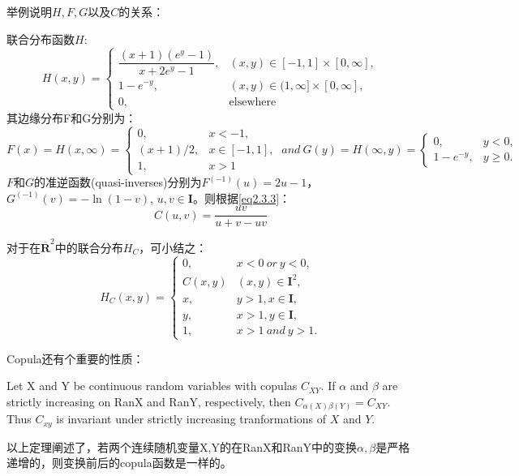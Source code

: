 举例说明$H,F,G$以及$C$的关系：
\begin{example}
    联合分布函数$H$:
    \begin{equation*}
        H(x,y) = 
            \begin{cases}
                \dfrac{(x+1)(e^y-1)}{x+2e^y-1}, & (x,y) \in [-1,1]\times [0,\infty], \\
            1-e^{-y},   & (x,y) \in (1,\infty] \times [0,\infty], \\
            0, & \mbox{elsewhere}
            \end{cases}
    \end{equation*}
    其边缘分布F和G分别为：
    \begin{equation*}
        F(x) = H(x,\infty)=
        \begin{cases}
            0, &x<-1,\\
            (x+1)/2, &x\in[-1,1], \\
            1, &x>1
        \end{cases}
        \ and \ 
        G(y) = H(\infty,y) = 
        \begin{cases}
            0, &y<0, \\
            1-e^{-y}, &y\geq 0.
        \end{cases}
    \end{equation*}
    $F$和$G$的准逆函数(quasi-inverses)分别为$F^{(-1)}(u) = 2u-1$，$G^{(-1)}(v) = -\ln (1-v)$, $u,v \in \mathbf{I}$。则根据\cref{eq2.3.3}：
    \begin{equation}
        C(u,v) = \dfrac{uv}{u+v-uv}
        \label{eq2.3.4}
    \end{equation}
    \label{example-copula}
\end{example}
对于在$\overline{\mathbf{R}}^2$中的联合分布$H_C$，可小结之：
\begin{equation}
    H_C(x,y) = 
    \begin{cases}
        0, &x<0 \ or \ y<0,\\
        C(x,y) &(x,y) \in \mathbf{I}^2, \\
        x, &y>1, x \in \mathbf{I}, \\
        y, &x>1, y \in \mathbf{I}, \\
        1, &x>1 \ and \ y>1.
    \end{cases}
    \label{eq-conclusion}
\end{equation}

Copula还有个重要的性质：
\begin{theorem}
    Let X and Y be continuous random variables with copulas $C_{XY}$. If $\alpha$ and $\beta$ are strictly increasing on RanX and RanY, respectively, then $C_{\alpha(X)\beta(Y)} = C_{XY}$. Thus \textcolor[rgb]{1,0,0}{$C_{xy}$ is invariant under strictly increasing tranformations of $X$ and $Y$}.
    \label{thr2.4.3}
\end{theorem}
以上定理阐述了，若两个连续随机变量X,Y的在RanX和RanY中的变换$\alpha,\beta$是严格递增的，则变换前后的copula函数是一样的。

